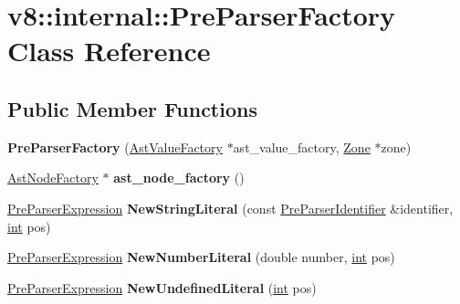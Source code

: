 \hypertarget{classv8_1_1internal_1_1PreParserFactory}{}\section{v8\+:\+:internal\+:\+:Pre\+Parser\+Factory Class Reference}
\label{classv8_1_1internal_1_1PreParserFactory}
\subsection*{Public Member Functions}
\begin{DoxyCompactItemize}
\item 
\mbox{\label{classv8_1_1internal_1_1PreParserFactory_a372a8fc981db489cc1d51b1726109166}} 
{\bfseries Pre\+Parser\+Factory} (\mbox{\hyperlink{classv8_1_1internal_1_1AstValueFactory}{Ast\+Value\+Factory}} $\ast$ast\+\_\+value\+\_\+factory, \mbox{\hyperlink{classv8_1_1internal_1_1Zone}{Zone}} $\ast$zone)
\item 
\mbox{\label{classv8_1_1internal_1_1PreParserFactory_acb7e5de35ab9b86ad105f81698103f7c}} 
\mbox{\hyperlink{classv8_1_1internal_1_1AstNodeFactory}{Ast\+Node\+Factory}} $\ast$ {\bfseries ast\+\_\+node\+\_\+factory} ()
\item 
\mbox{\label{classv8_1_1internal_1_1PreParserFactory_a61d4937796c550212db81e6bf1ae5d0e}} 
\mbox{\hyperlink{classv8_1_1internal_1_1PreParserExpression}{Pre\+Parser\+Expression}} {\bfseries New\+String\+Literal} (const \mbox{\hyperlink{classv8_1_1internal_1_1PreParserIdentifier}{Pre\+Parser\+Identifier}} \&identifier, \mbox{\hyperlink{classint}{int}} pos)
\item 
\mbox{\label{classv8_1_1internal_1_1PreParserFactory_a5549d27a221f2bf8abb9b3a6df4d08e7}} 
\mbox{\hyperlink{classv8_1_1internal_1_1PreParserExpression}{Pre\+Parser\+Expression}} {\bfseries New\+Number\+Literal} (double number, \mbox{\hyperlink{classint}{int}} pos)
\item 
\mbox{\label{classv8_1_1internal_1_1PreParserFactory_ab8276c8f9cd1e92607ee29700e9b13ae}} 
\mbox{\hyperlink{classv8_1_1internal_1_1PreParserExpression}{Pre\+Parser\+Expression}} {\bfseries New\+Undefined\+Literal} (\mbox{\hyperlink{classint}{int}} pos)

\end{DoxyCompactItemize}
